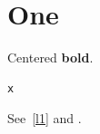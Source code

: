 \documentclass{article}
\begin{document}
\section{One}
\begin{center}Centered \textbf{bold}.\end{center}
\begin{lstlisting}[caption={Code},label=l1]
x
\end{lstlisting}
See~\ref{l1} and \thelstlisting.
\end{document}
